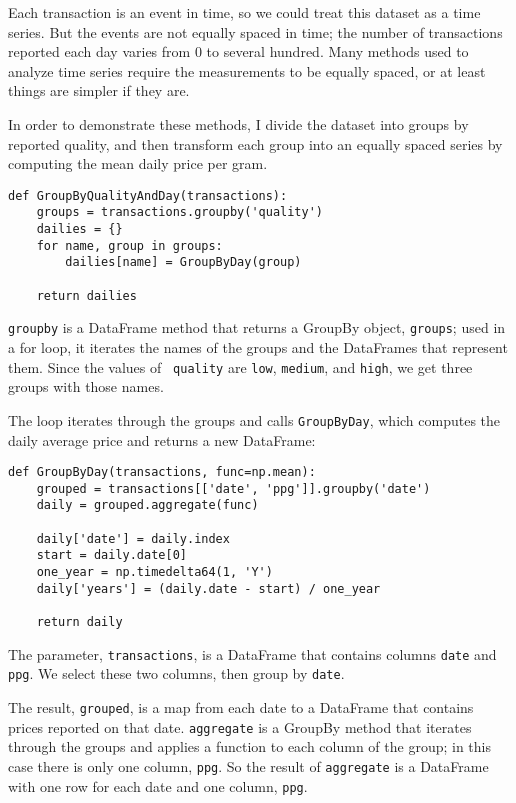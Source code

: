 \documentclass[12pt]{book}
\begin{document}
Each transaction is an event in time, so we could treat this dataset
as a time series.  But the events are not equally spaced in time; the
number of transactions reported each day varies from 0 to several
hundred.  Many methods used to analyze time series require the
measurements to be equally spaced, or at least things are simpler if
they are.

In order to demonstrate these methods, I divide the dataset
into groups by reported quality, and then transform each group into
an equally spaced series by computing the mean daily price per gram.

\begin{verbatim}
def GroupByQualityAndDay(transactions):
    groups = transactions.groupby('quality')
    dailies = {}
    for name, group in groups:
        dailies[name] = GroupByDay(group)        

    return dailies
\end{verbatim}

{\tt groupby} is a DataFrame method that returns a GroupBy object,
{\tt groups}; used in a for loop, it iterates the names of the groups
and the DataFrames that represent them.  Since the values of {\tt
  quality} are {\tt low}, {\tt medium}, and {\tt high}, we get three
groups with those names.   

The loop iterates through the groups and calls {\tt GroupByDay},
which computes the daily average price and returns a new DataFrame:

\begin{verbatim}
def GroupByDay(transactions, func=np.mean):
    grouped = transactions[['date', 'ppg']].groupby('date')
    daily = grouped.aggregate(func)

    daily['date'] = daily.index
    start = daily.date[0]
    one_year = np.timedelta64(1, 'Y')
    daily['years'] = (daily.date - start) / one_year

    return daily
\end{verbatim}

The parameter, {\tt transactions}, is a DataFrame that contains
columns {\tt date} and {\tt ppg}.  We select these two
columns, then group by {\tt date}.

The result, {\tt grouped}, is a map from each date to a DataFrame that
contains prices reported on that date.  {\tt aggregate} is a
GroupBy method that iterates through the groups and applies a
function to each column of the group; in this case there is only one
column, {\tt ppg}.  So the result of {\tt aggregate} is a DataFrame
with one row for each date and one column, {\tt ppg}.
\end{document}

